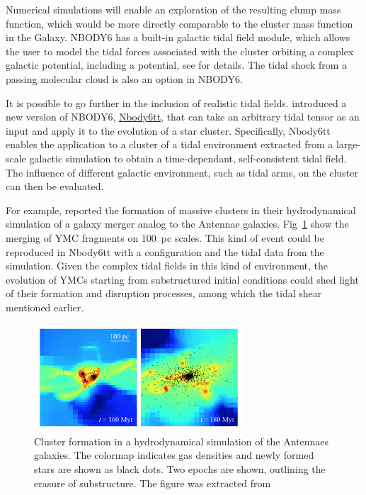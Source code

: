 Numerical simulations will enable an exploration of the resulting clump mass function, which would be more directly comparable to the cluster mass function in the Galaxy. NBODY6 has a built-in galactic tidal field module, which allows the user to model the tidal forces associated with the cluster orbiting a complex galactic potential, including a \cite{Miyamoto1975} potential, see \cite{Aarseth2003} for details. The tidal shock from a passing molecular cloud is also an option in NBODY6.

It is possible to go further in the inclusion of realistic tidal fields. \cite{Renaud2011} introduced a new version of NBODY6, \href{http://personal.ph.surrey.ac.uk/~fr0005/nbody6tt.php}{Nbody6tt}, that can take an arbitrary tidal tensor as an input and apply it to the evolution of a star cluster. Specifically, Nbody6tt enables the application to a cluster of a tidal environment extracted from a large-scale galactic simulation to obtain a time-dependant, self-consistent tidal field. The influence of different galactic environment, such as tidal arms, on the cluster can then be evaluated. 

For example, \cite{Renaud2015b} reported the formation of massive clusters in their hydrodynamical simulation of a galaxy merger analog to the Antennae galaxies. Fig~\ref{Fig:7_renaud} show the merging of YMC fragments on 100~pc scales. This kind of event could be reproduced in Nbody6tt with a \HubLem configuration and the tidal data from the simulation. Given the complex tidal fields in this kind of environment, the evolution of YMCs starting from substructured initial conditions could shed light of their formation and disruption processes, among which the tidal shear mentioned earlier.


\begin{figure}
\begin{center}
\includegraphics[width=0.7\textwidth]{Figures/7_renaudantennas.png}
\end{center}
\caption[Cluster formation in a hydrodynamical simulation of the Antennae galaxies]{Cluster formation in a hydrodynamical simulation of the Antennaes galaxies. The colormap indicates gas densities and newly formed stars are shown as black dots. Two epochs are shown, outlining the erasure of substructure. The figure was extracted from \cite{Renaud2015b} }
\label{Fig:7_renaud}
\end{figure} 



